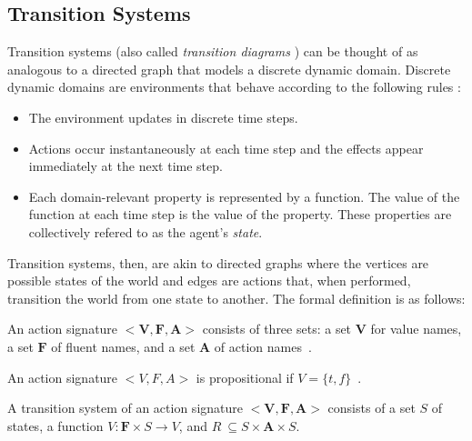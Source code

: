 \subsection{Transition Systems}
\label{subsec:transition_systems}

Transition systems (also called \textit{transition diagrams} \cite{blount_architecture_2013}) can be thought of as analogous to a directed graph that models a discrete dynamic domain.
Discrete dynamic domains are environments that behave according to the following rules \cite{blount_architecture_2013}:

\begin{itemize}
    \item The environment updates in discrete time steps.
    \item Actions occur instantaneously at each time step and the effects appear immediately at the next time step.
    \item Each domain-relevant property is represented by a function.
        The value of the function at each time step is the value of the property.
        These properties are collectively refered to as the agent's \textit{state}.
\end{itemize}

Transition systems, then, are akin to directed graphs where the vertices are possible states of the world and edges are actions that, when performed, transition the world from one state to another.
The formal definition is as follows:

\begin{definition}
    An action signature $ < \boldsymbol{V}, \boldsymbol{F}, \boldsymbol{A}> $ consists of three sets: a set $ \boldsymbol{V} $ for value names, a set $ \boldsymbol{F} $ of fluent names, and a set $ \boldsymbol{A} $ of action names~\cite{gelfond_action_1998}.
\end{definition}

\begin{definition}
    An action signature $< V,F,A >$ is propositional if $V=\{t,f\}$~\cite{gelfond_action_1998}.
\end{definition}

\begin{definition}
    A transition system of an action signature $ < \boldsymbol{V}, \boldsymbol{F}, \boldsymbol{A}> $ consists of a set $ S $ of states, a function $ V : \boldsymbol{F} \times S\rightarrow V $, and $ R\ \subseteq S \times \boldsymbol{A} \times S $.
\end{definition}

